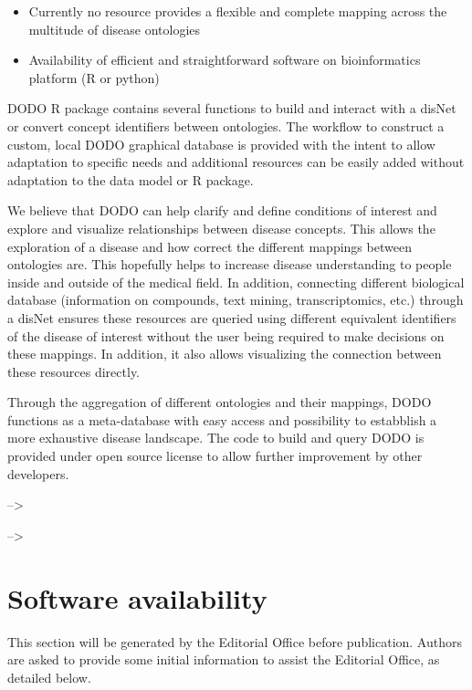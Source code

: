 \documentclass[9pt,a4paper,]{extarticle}
\begin{document}
\begin{itemize}
\item
  Currently no resource provides a flexible and complete mapping across the multitude of disease ontologies
\item
  Availability of efficient and straightforward software on bioinformatics platform (R or python)
\end{itemize}

DODO R package contains several functions to build and interact with a disNet or convert concept identifiers between ontologies. The workflow to construct a custom, local DODO graphical database is provided with the intent to allow adaptation to specific needs and additional resources can be easily added without adaptation to the data model or R package.

We believe that DODO can help clarify and define conditions of interest and explore and visualize relationships between disease concepts. This allows the exploration of a disease and how correct the different mappings between ontologies are. This hopefully helps to increase disease understanding to people inside and outside of the medical field. In addition, connecting different biological database (information on compounds, text mining, transcriptomics, etc.) through a disNet ensures these resources are queried using different equivalent identifiers of the disease of interest without the user being required to make decisions on these mappings. In addition, it also allows visualizing the connection between these resources directly.

Through the aggregation of different ontologies and their mappings, DODO functions as a meta-database with easy access and possibility to estabblish a more exhaustive disease landscape. The code to build and query DODO is provided under open source license to allow further improvement by other developers.

--\textgreater{}

--\textgreater{}

\hypertarget{software-availability}{%
\section{Software availability}\label{software-availability}}

This section will be generated by the Editorial Office before publication. Authors are asked to provide some initial information to assist the Editorial Office, as detailed below.
\end{document}
